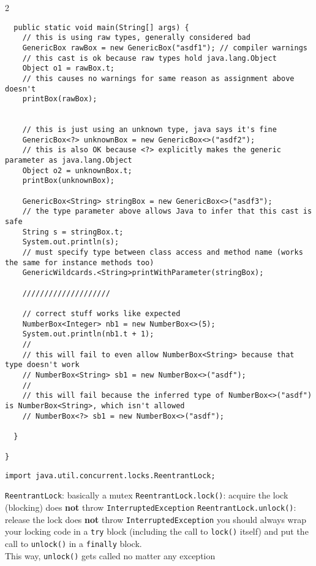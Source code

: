 \documentclass{article}
\def \columncount {2}
\newcommand{\java}{\texttt}
\begin{document}
\begin{multicols}{\columncount}
\begin{outline}[longenum]
\begin{verbatim}
  public static void main(String[] args) {
    // this is using raw types, generally considered bad
    GenericBox rawBox = new GenericBox("asdf1"); // compiler warnings
    // this cast is ok because raw types hold java.lang.Object
    Object o1 = rawBox.t;
    // this causes no warnings for same reason as assignment above doesn't
    printBox(rawBox);
    

    // this is just using an unknown type, java says it's fine
    GenericBox<?> unknownBox = new GenericBox<>("asdf2");
    // this is also OK because <?> explicitly makes the generic parameter as java.lang.Object
    Object o2 = unknownBox.t;
    printBox(unknownBox);

    GenericBox<String> stringBox = new GenericBox<>("asdf3");
    // the type parameter above allows Java to infer that this cast is safe
    String s = stringBox.t;
    System.out.println(s);
    // must specify type between class access and method name (works the same for instance methods too)
    GenericWildcards.<String>printWithParameter(stringBox);

    ////////////////////

    // correct stuff works like expected
    NumberBox<Integer> nb1 = new NumberBox<>(5);
    System.out.println(nb1.t + 1);
    //
    // this will fail to even allow NumberBox<String> because that type doesn't work
    // NumberBox<String> sb1 = new NumberBox<>("asdf");
    // 
    // this will fail because the inferred type of NumberBox<>("asdf") is NumberBox<String>, which isn't allowed
    // NumberBox<?> sb1 = new NumberBox<>("asdf");

  }

}
\end{verbatim}



\begin{verbatim}
import java.util.concurrent.locks.ReentrantLock;
\end{verbatim}
  \1 \java{ReentrantLock}: basically a mutex
  \1 \java{ReentrantLock.lock()}: acquire the lock (blocking)
    \2 does \textbf{not} throw \java{InterruptedException}
  \1 \java{ReentrantLock.unlock()}: release the lock
    \2 does \textbf{not} throw \java{InterruptedException}
    \2 you should always wrap your locking code in a \java{try{}} block (including the call to \java{lock()} itself) and put the call to \java{unlock()} in a \java{finally{}} block.
    \\This way, \java{unlock()} gets called no matter any exception


\end{outline}
\end{multicols}
\end{document}
